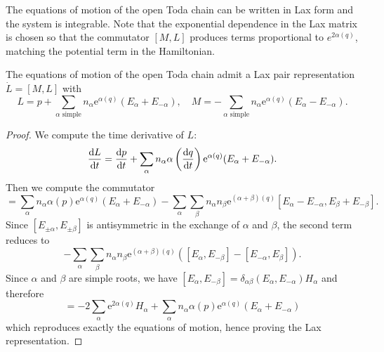 The equations of motion of the open Toda chain can be written in Lax form and the system is integrable.
Note that the exponential dependence in the Lax matrix is chosen so that the commutator $[M,L]$ produces terms proportional to $e^{2\alpha(q)}$, matching the potential term in the Hamiltonian.

\begin{proposition}
    The equations of motion of the open Toda chain admit a Lax pair representation $\dot{L} = {[M,L]}$ with 
    \begin{equation} \label{eq:lax_matrix_toda_chain}
        L = p + \sum_{\alpha \text{ simple}} n_\alpha \mathrm{e}^{\alpha(q)} (E_\alpha + E_{-\alpha}), \quad M = - \sum_{\alpha \text{ simple}} n_\alpha \mathrm{e}^{\alpha(q)} (E_\alpha - E_{-\alpha}).
    \end{equation}
\end{proposition}
\begin{proof}
   We compute the time derivative of $L$:
   \begin{equation}
       \dv{L}{t} = \dv{p}{t} + \sum_\alpha n_\alpha \alpha \left( \dv{q}{t} \right) \mathrm{e}^{\alpha(q)} (E_\alpha + E_{-\alpha}).
   \end{equation}
   Then we compute the commutator
   \begin{equation}
       [M,L] = \sum_\alpha n_\alpha \alpha(p) \mathrm{e}^{\alpha(q)} (E_\alpha + E_{- \alpha}) - \sum_\alpha \sum_\beta n_\alpha n_\beta \mathrm{e}^{(\alpha + \beta)(q)} [E_\alpha - E_{-\alpha}, E_\beta + E_{-\beta}].
   \end{equation}
   Since $[E_{\pm \alpha}, E_{\pm \beta}]$ is antisymmetric in the exchange of $\alpha$ and $\beta$, the second term reduces to 
   \begin{equation}
    - \sum_\alpha \sum_\beta n_\alpha n_\beta \mathrm{e}^{(\alpha + \beta)(q)} ([E_\alpha, E_{-\beta}] - [E_{-\alpha},E_{\beta}]).
   \end{equation}
   Since $\alpha$ and $\beta$ are simple roots, we have $[E_\alpha, E_{-\beta}] = \delta_{\alpha\beta}( E_{\alpha}, E_{-\alpha} ) H_\alpha$
   and therefore
   \begin{equation}
       [M,L] = -2\sum_\alpha \mathrm{e}^{2\alpha(q)} H_\alpha + \sum_{\alpha} n_\alpha \alpha(p) \mathrm{e}^{\alpha(q)} (E_\alpha + E_{-\alpha})
   \end{equation}
   which reproduces exactly the equations of motion, hence proving the Lax representation.
\end{proof}



